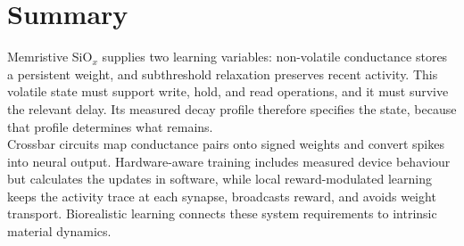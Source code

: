 \section[Summary]{Summary}\label{sec:2p4}

\noindent Memristive SiO$_x$ supplies two learning variables: non-volatile conductance stores a persistent weight,
and subthreshold relaxation preserves recent activity. This volatile state must support write, hold, and read
operations, and it must survive the relevant delay. Its measured decay profile therefore specifies the state, because
that profile determines what remains.\\

\noindent Crossbar circuits map conductance pairs onto signed weights and convert spikes into neural output.
Hardware-aware training includes measured device behaviour but calculates the updates in software, while local
reward-modulated learning keeps the activity trace at each synapse, broadcasts reward, and avoids weight transport.
Biorealistic learning connects these system requirements to intrinsic material dynamics.
